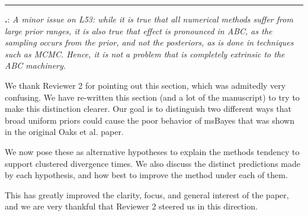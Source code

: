 \documentclass[12pt]{article}
\newcounter{commentCounter}
\newcommand{\revcomment}[1]{{\addtocounter{commentCounter}{1}}
    \medskip \hrule \noindent
\textbf{\arabic{section}.\arabic{commentCounter}}: {\sl #1}\par\xspace}
\newcommand{\response}[1]{{\addtolength{\leftskip}{0.25in} #1\par}\xspace}
\begin{document}
\revcomment{
    A minor issue on L53: while it is true that all numerical methods suffer
    from large prior ranges, it is also true that effect is pronounced in ABC,
    as the sampling occurs from the prior, and not the posteriors, as is done
    in techniques such as MCMC. Hence, it is not a problem that is completely
    extrinsic to the ABC machinery.
}
\response{
    We thank Reviewer 2 for pointing out this section, which was admitedly very
    confusing. We have re-written this section (and a lot of the manuscript) to
    try to make this distinction clearer. Our goal is to distinguish two
    different ways that broad uniform priors could cause the poor behavior of
    msBayes that was shown in the original Oaks et al. paper.

    We now pose these as alternative hypotheses to explain the methods tendency
    to support clustered divergence times. We also discuss the distinct
    predictions made by each hypothesis, and how best to improve the method
    under each of them.

    This has greatly improved the clarity, focus, and general interest of the
    paper, and we are very thankful that Reviewer 2 steered us in this
    direction.
}



\end{document}
